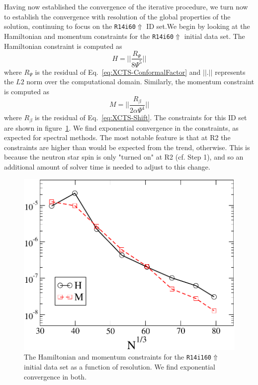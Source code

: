 Having now established the convergence of the iterative procedure, we
turn now to establish the convergence with resolution of the global
properties of the solution, continuing to focus on the {\tt R14i60$\Uparrow$} ID set.We begin by looking at the Hamiltonian and momentum constraints for the {\tt R14i60$\Uparrow$} initial data set.
The Hamiltonian constraint is computed as
\begin{equation}
H=||\frac{R_{\Psi}}{8\Psi^5}||
\end{equation}
where $R_{\Psi}$ is the residual of Eq.~\ref{eq:XCTS-ConformalFactor}
and $||.||$ represents the $L2$ norm over the computational
domain. Similarly, the momentum constraint is computed as
\begin{equation}
M = ||\frac{R_{\beta}}{2\alpha\Psi^4}||
\end{equation}
where $R_{\beta}$ is the residual of Eq.~\ref{eq:XCTS-Shift}.
The constraints for this ID set are shown in figure~\ref{fig:HamMom}. We find exponential convergence in the constraints, as expected for spectral methods. The most notable feature
is that at {\rm R2} the constraints are higher than would be expected
from the trend, otherwise. This is because the neutron star spin is
only "turned on" at {\rm R2} (cf. Step 1), and so an additional amount of
solver time is needed to adjust to this change.
\begin{figure}\includegraphics[width=0.95\columnwidth]{chap4/HamMom}
\caption[Hamiltonian and momentum constraints of the {\tt R14i160$\Uparrow$} ID set]{\label{fig:HamMom} The Hamiltonian and momentum constraints for the {\tt R14i160$\Uparrow$} initial data set
as a function of resolution. We find exponential convergence in both.}
\end{figure}

